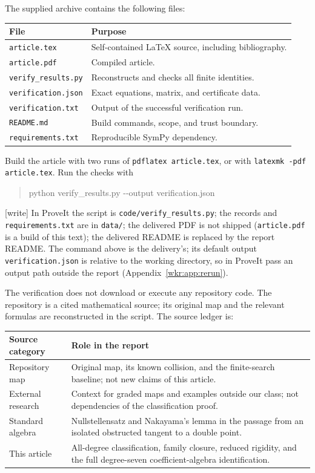 \documentclass[11pt,a4paper]{article}
\numberwithin{equation}{section}
\theoremstyle{definition}
\theoremstyle{remark}
\newcommand{\wtag}{\textup{[write]}}%
\newcommand{\rpath}[1]{\nolinkurl{#1}}
\begin{document}
The supplied archive contains the following files:
\begin{center}
\begin{tabular}{@{}p{}p{}@{}}
\toprule
File & Purpose\\
\midrule
\texttt{article.tex} & Self-contained LaTeX source, including bibliography.\\
\texttt{article.pdf} & Compiled article.\\
\texttt{verify\_results.py} & Reconstructs and checks all finite identities.\\
\texttt{verification.json} & Exact equations, matrix, and certificate data.\\
\texttt{verification.txt} & Output of the successful verification run.\\
\texttt{README.md} & Build commands, scope, and trust boundary.\\
\texttt{requirements.txt} & Reproducible SymPy dependency.\\
\bottomrule
\end{tabular}
\end{center}
Build the article with two runs of \texttt{pdflatex article.tex}, or with
\texttt{latexmk -pdf article.tex}. Run the checks with
\begin{quote}\ttfamily
python verify\_results.py -{}-output verification.json
\end{quote}
\wtag{} In ProveIt the script is \rpath{code/verify_results.py}; the
records and \rpath{requirements.txt} are in \rpath{data/}; the delivered
PDF is not shipped (\rpath{article.pdf} is a build of this text); the
delivered README is replaced by the report README. The command above is
the delivery's; its default output \rpath{verification.json} is relative
to the working directory, so in ProveIt pass an output path outside the
report (Appendix~\ref{wkr:app:rerun}).

The verification does not download or execute any repository code. The
repository is a cited mathematical source; its original map and the
relevant formulas are reconstructed in the script. The source ledger is:
\begin{center}
\begin{tabular}{@{}p{}p{}@{}}
\toprule
Source category & Role in the report\\
\midrule
Repository map & Original map, its known collision, and the finite-search
baseline; not new claims of this article.\\
External research & Context for graded maps and examples outside our class;
not dependencies of the classification proof.\\
Standard algebra & Nullstellensatz and Nakayama's lemma in the passage from
an isolated obstructed tangent to a double point.\\
This article & All-degree classification, family closure, reduced rigidity,
and the full degree-seven coefficient-algebra identification.\\
\bottomrule
\end{tabular}
\end{center}
\end{document}
